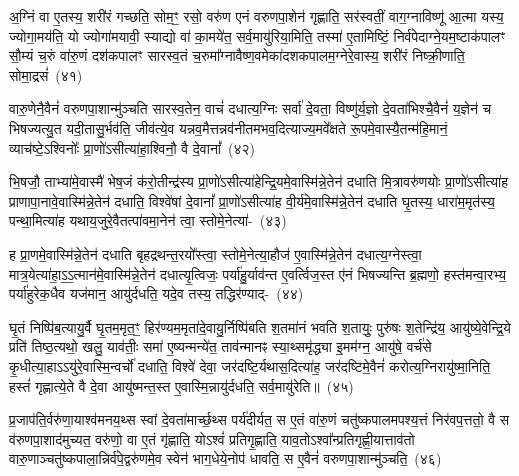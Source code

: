 {\anuvakamend[{विश्वे॑षां दे॒वानां᳚ प्रा॒णो॑\-ऽसि त्रि॒ष्टुभो॑ वर्त॒न्या शु॒क्रस्य॑ वी॒र्ये॑ण दे॒वस्त्वा॑ सवि॒तोथ्सोम॒ आयु॑ष्मा॒न्पञ्च॑विꣳशतिश्च}]}%

अ॒ग्निं वा ए॒तस्य॒ शरी॑रं गच्छति॒ सोम॒ꣳ॒ रसो॒ वरु॑ण एनं वरुणपा॒शेन॑ गृह्णाति॒ सर॑स्वतीं॒ वाग॒ग्नाविष्णू॑ आ॒त्मा यस्य॒ ज्योगा॒मय॑ति॒ यो ज्योगा॑मयावी॒ स्याद्यो वा॑ का॒मये॑त॒ सर्व॒मायु॑रिया॒मिति॒ तस्मा॑ ए॒तामिष्टिं॒ निर्व॑पेदाग्ने॒यम॒ष्टाक॑पालꣳ सौ॒म्यं च॒रुं वा॑रु॒णं दश॑\-कपालꣳ सारस्व॒तं च॒रुमा᳚ग्नावैष्ण॒वमेका॑\-दश\-कपालम॒ग्नेरे॒वास्य॒ शरी॑रं निष्क्री॒णाति॒ सोमा॒द्रसं॑~(४१)

वारु॒णेनै॒वैनं॑ वरुणपा॒शान्मु॑ञ्चति सारस्व॒तेन॒ वाचं॑ दधात्य॒ग्निः सर्वा॑ दे॒वता॒ विष्णु॑र्य॒ज्ञो दे॒वता॑भिश्चै॒वैनं॑ य॒ज्ञेन॑ च भिषज्यत्यु॒त यदी॒तासु॒र्भव॑ति॒ जीव॑त्ये॒व यन्नव॒मैत्तन्नव॑नीतमभव॒दित्याज्य॒मवे᳚क्षते रू॒पमे॒वास्यै॒तन्म॑हि॒मानं॒ व्याच॑ष्टे॒\-ऽश्विनोः᳚ प्रा॒णो॑\-ऽसीत्या॑हा॒श्विनौ॒ वै दे॒वानां᳚~(४२)

भि॒षजौ॒ ताभ्या॑मे॒वास्मै॑ भेष॒जं क॑रो॒तीन्द्र॑स्य प्रा॒णो॑\-ऽसीत्या॑हेन्द्रि॒यमे॒वास्मि॑न्ने॒तेन॑ दधाति मि॒त्रावरु॑णयोः प्रा॒णो॑\-ऽसीत्या॑ह प्राणापा॒नावे॒वास्मि॑न्ने॒तेन॑ दधाति॒ विश्वे॑षां दे॒वानां᳚ प्रा॒णो॑\-ऽसीत्या॑ह वी॒र्य॑मे॒वास्मि॑न्ने॒तेन॑ दधाति घृ॒तस्य॒ धारा॑म॒मृत॑स्य॒ पन्था॒मित्या॑ह यथाय॒जुरे॒वैतत्पा॑वमा॒नेन॑ त्वा॒ स्तोमे॒नेत्या॑-~(४३)

ह प्रा॒णमे॒वास्मि॑न्ने॒तेन॑ दधाति बृहद्रथन्त॒रयो᳚स्त्वा॒ स्तोमे॒नेत्या॒हौज॑ ए॒वास्मि॑न्ने॒तेन॑ दधात्य॒ग्नेस्त्वा॒ मात्र॒येत्या॑\-हा॒\-ऽ॒\-ऽ॒\-त्मान॑\-मे॒वास्मि॑न्ने॒तेन॑ दधात्यृ॒त्विजः॒ पर्या॑हु॒र्याव॑न्त ए॒वर्त्विज॒स्त ए॑नं भिषज्यन्ति ब्र॒ह्मणो॒ हस्त॑मन्वा॒रभ्य॒ पर्या॑हुरेक॒धैव यज॑मान॒ आयु॑र्दधति॒ यदे॒व तस्य॒ तद्धिर॑ण्याद्-~(४४)

घृ॒तं निष्पि॑ब॒त्यायु॒र्वै घृ॒तम॒मृत॒ꣳ॒ हिर॑ण्यम॒मृता॑दे॒वायु॒र्निष्पि॑बति श॒तमा॑नं भवति श॒तायुः॒ पुरु॑षः श॒तेन्द्रि॑य॒ आयु॑ष्ये॒वेन्द्रि॒ये प्रति॑ तिष्ठ॒त्यथो॒ खलु॒ याव॑तीः॒ समा॑ ए॒ष्यन्मन्ये॑त॒ ताव॑न्मानꣴ स्या॒थ्समृ॑द्ध्या इ॒मम॑ग्न॒ आयु॑षे॒ वर्च॑से कृ॒धीत्या॒हा\-ऽऽ\-यु॑रे॒वास्मि॒न्वर्चो॑ दधाति॒ विश्वे॑ देवा॒ जर॑दष्टि॒र्यथास॒दित्या॑ह॒ जर॑दष्टिमे॒वैनं॑ करोत्य॒ग्निरायु॑ष्मा॒निति॒ हस्तं॑ गृह्णात्ये॒ते वै दे॒वा आयु॑ष्मन्त॒स्त ए॒वास्मि॒न्नायु॑र्दधति॒ सर्व॒मायु॑रेति॥~(४५)

{\anuvakamend[{रसं॑ दे॒वाना॒ꣴ॒ स्तोमे॒नेति॒ हिर॑ण्या॒दस॒दिति॒ द्वाविꣳ॑शतिश्च}]}%

प्र॒जा\-प॑ति॒र्वरु॑णा॒याश्व॑मनय॒थ्स स्वां दे॒वता॑मार्च्छ॒थ्स पर्य॑दीर्यत॒ स ए॒तं वा॑रु॒णं चतु॑ष्कपालमपश्य॒त्तं निर॑वप॒त्ततो॒ वै स व॑रुणपा॒शाद॑मुच्यत॒ वरु॑णो॒ वा ए॒तं गृ॑ह्णाति॒ यो\-ऽश्वं॑ प्रतिगृ॒ह्णाति॒ याव॒तो\-ऽश्वा᳚न्प्रतिगृह्णी॒यात्ताव॑तो वारु॒णाञ्चतु॑ष्कपाला॒न्निर्व॑पे॒द्वरु॑णमे॒व स्वेन॑ भाग॒धेये॒नोप॑ धावति॒ स ए॒वैनं॑ वरुणपा॒शान्मु॑ञ्चति॒~(४६)

